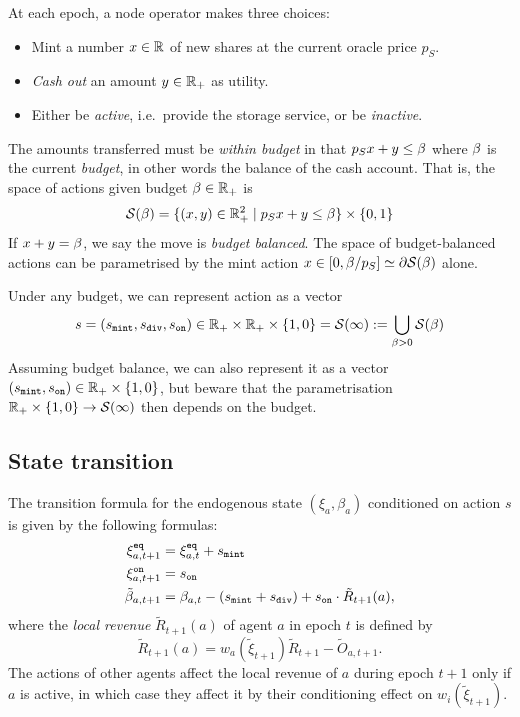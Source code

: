 At each epoch, a node operator makes three choices:
%
\begin{itemize}
  \item Mint a number $x\in\mathbb{R}$ of new shares at the current oracle price $p_S$.
  \item \emph{Cash out} an amount $y\in\mathbb{R}_+$ as utility.
  \item Either be \emph{active}, i.e.~provide the storage service, or be \emph{inactive}.
\end{itemize}
%
The amounts transferred must be \emph{within budget} in that $p_Sx+y\leq \beta$ where $\beta$ is the current \emph{budget}, in other words the balance of the cash account.
%
That is, the space of actions given budget $\beta\in\mathbb{R}_+$ is
\[
  \mathcal{S}(\beta) = \{(x,y)\in \mathbb{R}_+^2 \mid p_Sx+y\leq \beta \} \times \{0,1\}
\]
%
If $x+y = \beta$, we say the move is \emph{budget balanced}.
%
The space of budget-balanced actions can be parametrised by the mint action $x\in[0,\beta/p_S]\simeq\partial\mathcal{S}(\beta)$ alone.

Under any budget, we can represent action as a vector
%
\[
  s = (s_\mathtt{mint},s_\mathtt{div},s_\mathtt{on}) \in \mathbb{R}_+ \times \mathbb{R}_+ \times \{1,0\} = \mathcal{S}(\infty) := \bigcup_{\beta>0}\mathcal{S}(\beta)
\]
%
Assuming budget balance, we can also represent it as a vector $(s_\mathtt{mint},s_{\mathtt{on}})\in\mathbb{R}_+\times\{1,0\}$, but beware that the parametrisation $\mathbb{R}_+ \times  \{1,0\}\rightarrow \mathcal{S}(\infty)$ then depends on the budget.



\subsection{State transition}
The transition formula for the endogenous state $(\xi_a,\beta_a)$ conditioned on action $s$ is given by the following formulas:
\begin{align*}
  \xi^{\mathtt{eq}}_{a,t+1} &= \xi^{\mathtt{eq}}_{a,t} + s_\mathtt{mint} \\
  \xi^{\mathtt{on}}_{a,t+1} &= s_\mathtt{on} \\
  \tilde\beta_{a,t+1} &= \beta_{a,t} - (s_\mathtt{mint} + s_\mathtt{div}) + s_{\mathtt{on}} \cdot \tilde{R}_{t+1}(a),
\end{align*}
%
where the \emph{local revenue} $\tilde{R}_{t+1}(a)$ of agent $a$ in epoch $t$ is defined by
%
\[
  \tilde{R}_{t+1}(a) = w_a(\tilde{\xi}_{t+1})\tilde{R}_{t+1} - \tilde{O}_{a,t+1}.
\]
%
The actions of other agents affect the local revenue of $a$ during epoch $t+1$ only if $a$ is active, in which case they affect it by their conditioning effect on $w_i(\tilde{\xi}_{t+1})$.

